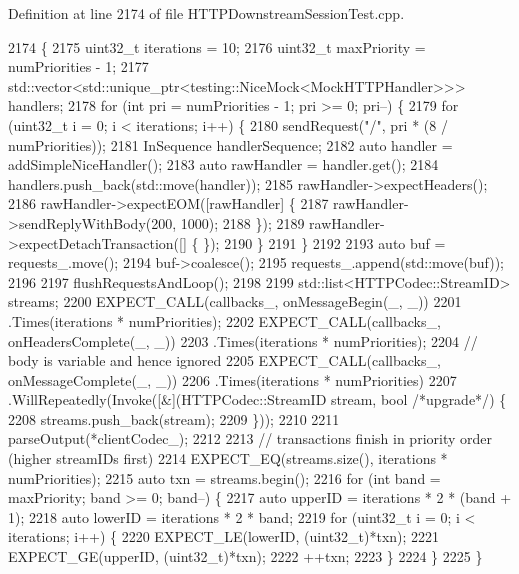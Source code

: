 Definition at line 2174 of file H\+T\+T\+P\+Downstream\+Session\+Test.\+cpp.


\begin{DoxyCode}
2174                                                                  \{
2175   uint32\_t iterations = 10;
2176   uint32\_t maxPriority = numPriorities - 1;
2177   std::vector<std::unique\_ptr<testing::NiceMock<MockHTTPHandler>>> handlers;
2178   \textcolor{keywordflow}{for} (\textcolor{keywordtype}{int} pri = numPriorities - 1; pri >= 0; pri--) \{
2179     \textcolor{keywordflow}{for} (uint32\_t i = 0; i < iterations; i++) \{
2180       sendRequest(\textcolor{stringliteral}{"/"}, pri * (8 / numPriorities));
2181       InSequence handlerSequence;
2182       \textcolor{keyword}{auto} handler = addSimpleNiceHandler();
2183       \textcolor{keyword}{auto} rawHandler = handler.get();
2184       handlers.push\_back(std::move(handler));
2185       rawHandler->expectHeaders();
2186       rawHandler->expectEOM([rawHandler] \{
2187           rawHandler->sendReplyWithBody(200, 1000);
2188         \});
2189       rawHandler->expectDetachTransaction([] \{  \});
2190     \}
2191   \}
2192 
2193   \textcolor{keyword}{auto} buf = requests_.move();
2194   buf->coalesce();
2195   requests_.append(std::move(buf));
2196 
2197   flushRequestsAndLoop();
2198 
2199   std::list<HTTPCodec::StreamID> streams;
2200   EXPECT\_CALL(callbacks_, onMessageBegin(\_, \_))
2201     .Times(iterations * numPriorities);
2202   EXPECT\_CALL(callbacks_, onHeadersComplete(\_, \_))
2203     .Times(iterations * numPriorities);
2204   \textcolor{comment}{// body is variable and hence ignored}
2205   EXPECT\_CALL(callbacks_, onMessageComplete(\_, \_))
2206       .Times(iterations * numPriorities)
2207       .WillRepeatedly(Invoke([&](HTTPCodec::StreamID stream, \textcolor{keywordtype}{bool} \textcolor{comment}{/*upgrade*/}) \{
2208         streams.push\_back(stream);
2209       \}));
2210 
2211   parseOutput(*clientCodec_);
2212 
2213   \textcolor{comment}{// transactions finish in priority order (higher streamIDs first)}
2214   EXPECT\_EQ(streams.size(), iterations * numPriorities);
2215   \textcolor{keyword}{auto} txn = streams.begin();
2216   \textcolor{keywordflow}{for} (\textcolor{keywordtype}{int} band = maxPriority; band >= 0; band--) \{
2217     \textcolor{keyword}{auto} upperID = iterations * 2 * (band + 1);
2218     \textcolor{keyword}{auto} lowerID = iterations * 2 * band;
2219     \textcolor{keywordflow}{for} (uint32\_t i = 0; i < iterations; i++) \{
2220       EXPECT\_LE(lowerID, (uint32\_t)*txn);
2221       EXPECT\_GE(upperID, (uint32\_t)*txn);
2222       ++txn;
2223     \}
2224   \}
2225 \}
\end{DoxyCode}
